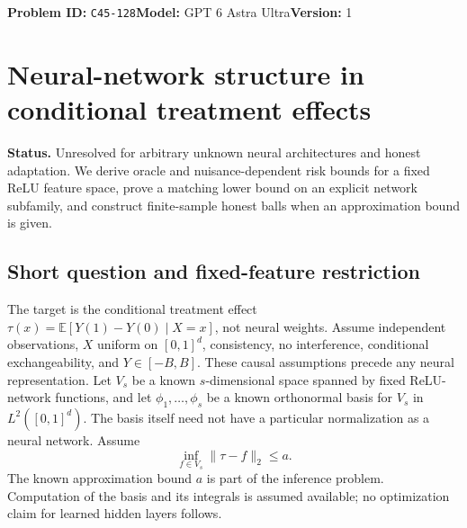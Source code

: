 \documentclass[11pt,a4paper]{article}
\newcommand{\E}{\mathbb E}
\begin{document}
\noindent\textbf{Problem ID:} \texttt{C45-128}\quad\textbf{Model:} GPT 6 Astra Ultra\quad\textbf{Version:} 1\par
\section*{Neural-network structure in conditional treatment effects}

\textbf{Status.} Unresolved for arbitrary unknown neural architectures and honest adaptation. We derive oracle and nuisance-dependent risk bounds for a fixed ReLU feature space, prove a matching lower bound on an explicit network subfamily, and construct finite-sample honest balls when an approximation bound is given.

\subsection*{Short question and fixed-feature restriction}
The target is the conditional treatment effect $\tau(x)=\E[Y(1)-Y(0)\mid X=x]$, not neural weights. Assume independent observations, $X$ uniform on $[0,1]^d$, consistency, no interference, conditional exchangeability, and $Y\in[-B,B]$. These causal assumptions precede any neural representation. Let $V_s$ be a known $s$-dimensional space spanned by fixed ReLU-network functions, and let $\phi_1,\ldots,\phi_s$ be a known orthonormal basis for $V_s$ in $L^2([0,1]^d)$. The basis itself need not have a particular normalization as a neural network. Assume
\[
 \inf_{f\in V_s}\|\tau-f\|_2\leq a.
\]
The known approximation bound $a$ is part of the inference problem. Computation of the basis and its integrals is assumed available; no optimization claim for learned hidden layers follows.
\end{document}
